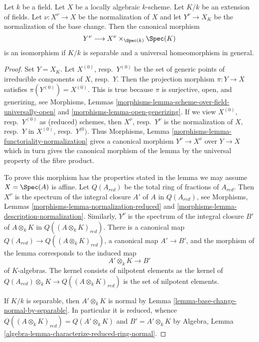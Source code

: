 \begin{lemma}
\label{lemma-normalization-and-change-of-fields}
Let $k$ be a field. Let $X$ be a locally algebraic $k$-scheme.
Let $K/k$ be an extension of fields. Let $\nu : X^\nu \to X$
be the normalization of $X$ and let $Y^\nu \to X_K$ be the
normalization of the base change. Then the canonical morphism
$$
Y^\nu \longrightarrow X^\nu \times_{\Spec(k)} \Spec(K)
$$
is an isomorphism if $K/k$ is separable and a universal homeomorphism
in general.
\end{lemma}

\begin{proof}
Set $Y = X_K$. Let $X^{(0)}$, resp.\ $Y^{(0)}$ be the set of generic points
of irreducible components of $X$, resp.\ $Y$. Then the projection morphism
$\pi : Y \to X$ satisfies $\pi(Y^{(0)}) = X^{(0)}$. This is true because
$\pi$ is surjective, open, and generizing, see
Morphisms, Lemmas \ref{morphisms-lemma-scheme-over-field-universally-open} and
\ref{morphisms-lemma-open-generizing}.
If we view $X^{(0)}$, resp.\ $Y^{(0)}$ as (reduced) schemes, then
$X^\nu$, resp.\ $Y^\nu$ is the normalization of $X$, resp.\ $Y$ in
$X^{(0)}$, resp.\ $Y^{(0})$.
Thus Morphisms, Lemma \ref{morphisms-lemma-functoriality-normalization}
gives a canonical morphism $Y^\nu \to X^\nu$ over $Y \to X$ which in
turn gives the canonical morphism of the lemma by the universal
property of the fibre product.

\medskip\noindent
To prove this morphism has the properties stated in the lemma we may
assume $X = \Spec(A)$ is affine. Let $Q(A_{red})$ be the
total ring of fractions of $A_{red}$. Then $X^\nu$ is the spectrum of
the integral closure $A'$ of $A$ in $Q(A_{red})$, see
Morphisms, Lemmas \ref{morphisms-lemma-normalization-reduced} and
\ref{morphisms-lemma-description-normalization}.
Similarly, $Y^\nu$ is the spectrum of the integral closure $B'$ of
$A \otimes_k K$ in $Q((A \otimes_k K)_{red})$. There is a canonical
map $Q(A_{red}) \to Q((A \otimes_k K)_{red})$, a canonical map
$A' \to B'$, and the morphism of the lemma corresponds to the induced map
$$
A' \otimes_k K \longrightarrow B'
$$
of $K$-algebras. The kernel consists of nilpotent
elements as the kernel of $Q(A_{red}) \otimes_k K \to Q((A \otimes_k K)_{red})$
is the set of nilpotent elements.

\medskip\noindent
If $K/k$ is separable, then $A' \otimes_k K$ is normal by
Lemma \ref{lemma-base-change-normal-by-separable}. In particular
it is reduced, whence $Q((A \otimes_k K)_{red}) = Q(A' \otimes_k K)$
and $B' = A' \otimes_k K$ by
Algebra, Lemma \ref{algebra-lemma-characterize-reduced-ring-normal}.


\end{proof}

